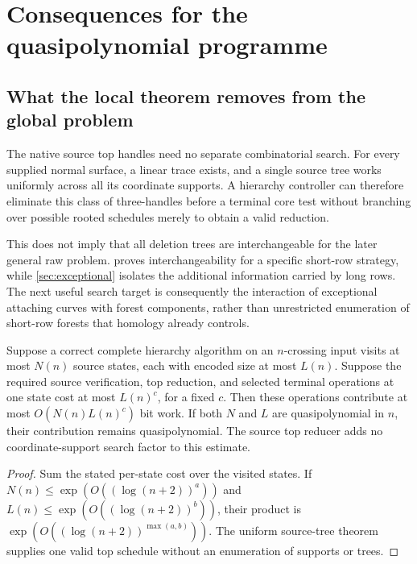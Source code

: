 \section{Consequences for the quasipolynomial programme}
\label{sec:research}

\subsection{What the local theorem removes from the global problem}

The native source top handles need no separate combinatorial search. For
every supplied normal surface, a linear trace exists, and a single source
tree works uniformly across all its coordinate supports. A hierarchy
controller can therefore eliminate this class of three-handles before a
terminal core test without branching over possible rooted schedules merely
to obtain a valid reduction.

This does not imply that all deletion trees are interchangeable for the
later general raw problem.  proves interchangeability for a
specific short-row strategy, while \cref{sec:exceptional} isolates the
additional information carried by long rows. The next useful search target
is consequently the interaction of exceptional attaching curves with
forest components, rather than unrestricted enumeration of short-row
forests that homology already controls.

\begin{proposition}
\label{prop:global}
Suppose a correct complete hierarchy algorithm on an $n$-crossing input
visits at most $N(n)$ source states, each with encoded size at most $L(n)$.
Suppose the required source verification, top reduction, and selected
terminal operations at one state cost at most $L(n)^c$, for a fixed $c$.
Then these operations contribute at most $O(N(n)L(n)^c)$ bit work. If
both $N$ and $L$ are quasipolynomial in $n$, their contribution remains
quasipolynomial. The source top reducer adds no coordinate-support search
factor to this estimate.
\end{proposition}

\begin{proof}
Sum the stated per-state cost over the visited states. If
$N(n)\leq\exp(O((\log(n+2))^a))$ and
$L(n)\leq\exp(O((\log(n+2))^b))$, their product is
$\exp(O((\log(n+2))^{\max(a,b)}))$. The uniform source-tree theorem
supplies one valid top schedule without an enumeration of supports or trees.
\end{proof}

